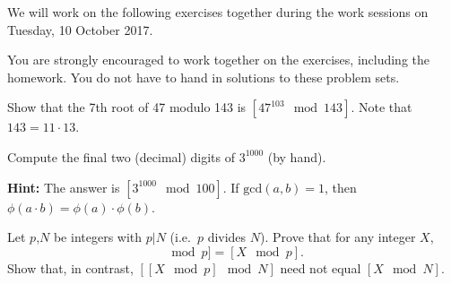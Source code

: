 \documentclass[a4paper,10pt,landscape,twocolumn]{scrartcl}
\newcommand\worksession{Tuesday, 10 October 2017}
\begin{document}
\problems

{\sffamily\noindent
We will work on the following exercises together during the work sessions on \worksession.

You are strongly encouraged to work together on the exercises, including the homework. You do not have to hand in solutions to these problem sets.}

\begin{exercise}
\begin{subex}
Show that the 7th root of 47 modulo 143 is $[47^{103} \mod 143]$. Note that $143=11\cdot 13$.
\end{subex}

\begin{subex}
Compute the final two (decimal) digits of $3^{1000}$ (by hand).

\textbf{Hint:} The answer is $[3^{1000} \mod 100]$. If $\text{gcd}(a,b)=1$, then $\phi(a\cdot b)=\phi(a)\cdot\phi(b)$.
\end{subex}

\begin{subex}
Let $p$,$N$ be integers with $p|N$ (i.e.\ $p$ divides $N$). Prove that for any integer $X$,
\begin{equation*}
[[X \mod N]\mod p]=[X \mod p].
\end{equation*}
Show that, in contrast, $[[X \mod p]\mod N]$ need not equal $[X\mod N]$.
\end{subex}

\end{exercise}


%

\end{document}
